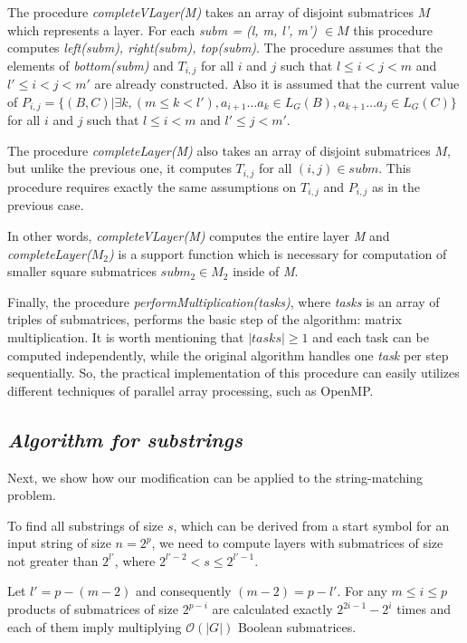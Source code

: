 The procedure \textit{completeVLayer(M)} takes an array of disjoint submatrices $M$ which represents a layer.
For each \textit{subm = (l, m, l', m') $\in M$} this procedure computes \textit{left(subm), right(subm), top(subm)}.
The procedure assumes that the elements of \textit{bottom(subm)} and $T_{i, j}$ for all $i$ and $j$ such that $l \leq i < j < m$ and $  l' \leq i < j < m'$ are already constructed.
Also it is assumed that the current value of
$P_{i, j} =  \{ (B, C) | \exists k, (m \le k < l'), a_{i + 1} \dots a_{k} \in L_G(B), a_{k + 1} \dots a_{j} \in L_G(C)\} $ for all $i$ and $j$ such that $l \leq i < m$ and $l' \leq j < m'$.

The procedure \textit{completeLayer(M)} also takes an array of disjoint submatrices $M$, but unlike the previous one, it computes $T_{i, j}$ for all $(i, j) \in subm$.
This procedure requires exactly the same assumptions on $T_{i, j}$  and $P_{i, j}$  as in the previous case.

In other words, \textit{completeVLayer(M)} computes the entire layer \textit{M} \linebreak and \textit{completeLayer($M_{2}$)} is a support function which is necessary for computation of smaller square submatrices $subm_{2} \in M_{2}$ inside of \textit{M}.

Finally, the procedure \textit{performMultiplication(tasks)}, where \textit{tasks} is an array of triples of submatrices, performs the basic step of the algorithm: matrix multiplication.
It is worth mentioning that $|tasks| \ge 1$ and each task can be computed independently, while the original algorithm handles one \textit{task} per step sequentially.
So, the practical implementation of this procedure can easily utilizes different techniques of parallel array processing, such as OpenMP.

\subsection{\bf \it Algorithm for substrings}

Next, we show how our modification can be applied to the string-matching problem.

To find all substrings of size $s$, which can be derived from a start symbol for an input string of size $n = 2^p$, we need to compute layers with submatrices of size not greater than $2^{l'}$, where $2^{l' - 2} < s \le 2^{l' - 1}$.

Let $l' = p - (m - 2)$ and consequently $(m - 2) = p - l'$.
For any  $m \le i \le p$ products of submatrices of size $2^{p - i}$ are calculated exactly $2^{2i - 1} - 2^{i}$ times and each of them imply multiplying $\mathcal{O}(|G|)$ Boolean submatrices.

